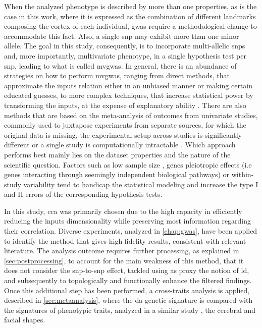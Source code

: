 When the analyzed phenotype is described by more than one properties, as is the case in this work, where it is expressed as the combination of different landmarks composing the cortex of each individual, \ac{gwas} require a methodological change to accommodate this fact. Also, a single \ac{snp} may exhibit more than one minor allele. The goal in this study, consequently, is to incorporate multi-allelic \acsp{snp} and, more importantly, multivariate phenotype, in a single hypothesis test per \ac{snp}, leading to what is called \ac{mvgwas}. In general, there is an abundance of strategies on how to perform \ac{mvgwas}, ranging from direct methods, that approximate the inputs relation either in an unbiased manner or making certain educated guesses, to more complex techniques, that increase statistical power by transforming the inputs, at the expense of explanatory ability \cite{Galesloot2014}. There are also methods that are based on the meta-analysis of outcomes from univariate studies, commonly used to juxtapose experiments from separate sources, for which the original data is missing, the experimental setup across studies is significantly different or a single study is computationally intractable \cite{Uffelmann2021,Cichonska2016}. Which approach performs best mainly lies on the dataset properties and the nature of the scientific question. Factors such as low sample size \cite{Sheng2021}, genes pleiotropic effects \cite{Fernandes2021} (i.e genes interacting through seemingly independent biological pathways) or within-study variability \cite{Usui2021,Jackson2011} tend to handicap the statistical modeling and increase the type I and II errors of the corresponding hypothesis tests. 





In this study, \ac{cca} was primarily chosen due to the high capacity in efficiently reducing the inputs dimensionality while preserving most information regarding their correlation. Diverse experiments, analyzed in \autoref{chap:gwas}, have been applied to identify the method that gives high fidelity results, consistent with relevant literature. The analysis outcome requires further processing, as explained in \autoref{sec:postprocessing}, to account for the main weakness of this method, that it does not consider the \ac{snp}-to-\ac{snp} effect, tackled using as proxy the notion of \ac{ld}, and subsequently to topologically and functionally enhance the filtered findings. Once this additional step has been performed, a cross-traits analysis is applied, described in \autoref{sec:metaanalysis}, where the \ac{da} genetic signature is compared with the signatures of phenotypic traits, analyzed in a similar study \cite{Naqvi2021}, the cerebral and facial shapes.


